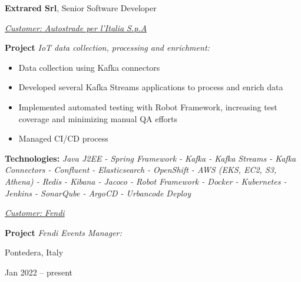 \documentclass[10pt, a4paper]{article}
\newenvironment{highlights}{
    \begin{itemize}[
        topsep=0.10 cm,
        parsep=0.10 cm,
        partopsep=0pt,
        itemsep=0pt,
        leftmargin=0.4 cm + 10pt
    ]
}{
    \end{itemize}
} %
\newenvironment{twocolentry}[2][]{
    \onecolentry
    \def\secondColumn{#2}
    \setcolumnwidth{\fill, 4.5 cm}
    \begin{paracol}{2}
}{
    \switchcolumn \raggedleft \secondColumn
    \end{paracol}
    \endonecolentry
} %
\begin{document}
        
        \begin{twocolentry}{
            \fontsize{14}{18}Pontedera, Italy

        Jan 2022 – present
            \normalsize
        }
            \fontsize{12}{16}
            \textcolor{secondaryColor}{\faBriefcase\hspace{4pt}\textbf{Extrared Srl},} Senior Software Developer
            \normalsize

            \vspace{0.10 cm}
                \vspace{0.10 cm}

                \textcolor{tertiaryColor}{\faAngleDoubleRight\hspace{0.1cm}\underline{\textit{Customer:} \textit{Autostrade per l'Italia S.p.A}}}

                \vspace{0.2cm}
                \textbf{Project \faAngleRight} \textit{IoT data collection, processing and enrichment:}

                \begin{highlights}
                        \item Data collection using Kafka connectors
                        \item Developed several Kafka Streams applications to process and enrich data
                        \item Implemented automated testing with Robot Framework, increasing test coverage and minimizing manual QA efforts
                        \item Managed CI/CD process
                \end{highlights}
                \faBuffer
                \textbf{ Technologies:} \textit{Java J2EE - Spring Framework - Kafka - Kafka Streams - Kafka Connectors - Confluent - Elasticsearch - OpenShift - AWS (EKS, EC2, S3, Athena) - Redis - Kibana - Jacoco - Robot Framework - Docker - Kubernetes - Jenkins - SonarQube - ArgoCD - Urbancode Deploy}

                \vspace{0.10 cm}

                \vspace{0.10 cm}

                \textcolor{tertiaryColor}{\faAngleDoubleRight\hspace{0.1cm}\underline{\textit{Customer:} \textit{Fendi}}}

                \vspace{0.2cm}
                \textbf{Project \faAngleRight} \textit{Fendi Events Manager:}


\end{twocolentry}
\end{document}

